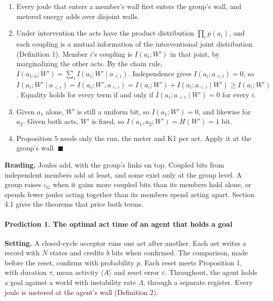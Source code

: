 \documentclass[
  10pt,
]{article}
\providecommand{\tightlist}{%
  \setlength{\itemsep}{0pt}\setlength{\parskip}{0pt}}
\begin{document}
\begin{enumerate}
\def\labelenumi{\arabic{enumi}.}
\tightlist
\item
  Every joule that enters a member's wall first enters the group's wall,
  and metered energy adds over disjoint walls.
\item
  Under intervention the acts have the product distribution
  \(\prod_i p(a_i)\), and each coupling is a mutual information of the
  interventional joint distribution (Definition 1). Member \(i\)'s
  coupling is \(I(a_i; W')\) in that joint, by marginalizing the other
  acts. By the chain rule,
  \(I(a_{1:n}; W') = \sum_i I(a_i; W' \mid a_{<i})\). Independence gives
  \(I(a_i; a_{<i}) = 0\), so
  \(I(a_i; W' \mid a_{<i}) = I(a_i; W', a_{<i}) = I(a_i; W') + I(a_i; a_{<i} \mid W') \ge I(a_i; W')\).
  Equality holds for every term if and only if
  \(I(a_i; a_{<i}\mid W') = 0\) for every \(i\).
\item
  Given \(a_1\) alone, \(W'\) is still a uniform bit, so
  \(I(a_1; W') = 0\), and likewise for \(a_2\). Given both acts, \(W'\)
  is fixed, so \(I(a_1, a_2; W') = H(W') = 1\) bit.
\item
  Proposition 5 needs only the run, the meter and K1 per act. Apply it
  at the group's wall. \(\blacksquare\)
\end{enumerate}

\textbf{Reading.} Joules add, with the group's links on top. Coupled
bits from independent members add at least, and some exist only at the
group level. A group raises \(\iota_G\) when it gains more coupled bits
than its members hold alone, or spends fewer joules acting together than
its members spend acting apart. Section 4.1 gives the theorems that
price both terms.

\paragraph{Prediction 1. The optimal act time of an agent that holds a
goal}\label{prediction-1.-the-optimal-act-time-of-an-agent-that-holds-a-goal}

\textbf{Setting.} A closed-cycle acceptor runs one act after another.
Each act writes a record with \(N\) states and credits \(b\) bits when
confirmed. The comparison, made before the reset, confirms with
probability \(p\). Each reset meets Proposition 1, with duration
\(\tau\), mean activity \(\langle A\rangle\) and reset error
\(\varepsilon\). Throughout, the agent holds a goal against a world with
instability rate \(\Lambda\), through a separate register. Every joule
is metered at the agent's wall (Definition 2).
\end{document}
